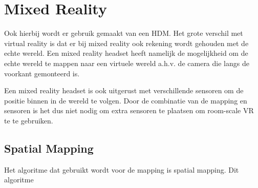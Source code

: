 \section{Mixed Reality} \label{sec:mixedreality}
Ook hierbij wordt er gebruik gemaakt van een HDM. Het grote verschil met virtual reality is dat er bij mixed reality ook rekening wordt gehouden met de echte wereld. Een mixed reality headset heeft namelijk de mogelijkheid om de echte wereld te mappen naar een virtuele wereld a.h.v. de camera die langs de voorkant gemonteerd is.

Een mixed reality headset is ook uitgerust met verschillende sensoren om de positie binnen in de wereld te volgen. Door de combinatie van de mapping en sensoren is het dus niet nodig om extra sensoren te plaatsen om room-scale VR te te gebruiken.
\subsection{Spatial Mapping}
Het algoritme dat gebruikt wordt voor de mapping is spatial mapping. Dit algoritme %